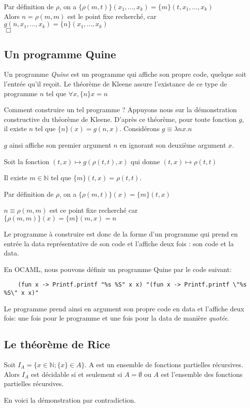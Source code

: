 Par définition de $\rho$, on a $\{ \rho(m,t)\}(x_1,...,x_k)=\{m\}(t,x_1,...,x_k)$ \\
Alors $n=\rho(m,m)$ est le point fixe recherché, car
$g(n,x_1,...,x_k)=\{n\}(x_1,...,x_k)$ \\ $ \Box $


\subsection{Un programme Quine}
Un programme \textit{Quine} est un programme qui affiche son propre code, quelque soit l'entrée qu'il reçoit.
Le théorème de Kleene assure l'existance de ce type de programme $n$ tel que $\forall x, \{n\}x=n $

Comment construire un tel programme ?
Appuyons nous sur la démonstration constructive du théorème de Kleene.
D'après ce théorème, pour toute fonction $g$, il existe $n$ tel que $\{n\}(x)=g(n,x)$. 
Considérons $g\equiv \lambda nx.n$


$g$ ainsi affiche son premier argument $n$ en ignorant son deuxième argument $x$.

Soit la fonction $(t,x) \mapsto g(\rho(t,t),x)$ qui donne $(t,x) \mapsto \rho(t,t)$


Il existe $m \in \mathbb{N}$ tel que $\{m\}(t,x)=\rho(t,t)$.

Par définition de $\rho$, on a $\{ \rho(m,t)\}(x)=\{ m \}(t,x)$


$n\equiv \rho(m,m)$ est ce point fixe recherché car $ \{ \rho(m,m)\} (x) = \{ m \} (m,x) = n $

Le programme à construire est donc de la forme d'un programme qui prend en entrée la data représentative de son code
et l'affiche deux fois : son code et la data.

En OCAML, nous pouvons définir un programme Quine par le code suivant:
\begin{Verbatim}
	(fun x -> Printf.printf "%s %S" x x) "(fun x -> Printf.printf \"%s %S\" x x)"	
\end{Verbatim}
Le programme prend ainsi en argument son propre code en data et l'affiche deux fois: une fois pour le programme 
et une fois pour la data de manière \textit{quotée}. 

\subsection{Le théorème de Rice}
\begin{theoreme}[Rice]
Soit $I_A=\{ x \in \mathbb{N}; \{x\} \in A \}$. A est un ensemble de fonctions partielles récursives. Alors 
$I_A$ est décidable si et seulement si $A=\emptyset$ ou $A$ est l'ensemble des fonctions partielles récursives.
\end{theoreme}
En voici la démonstration par contradiction.

